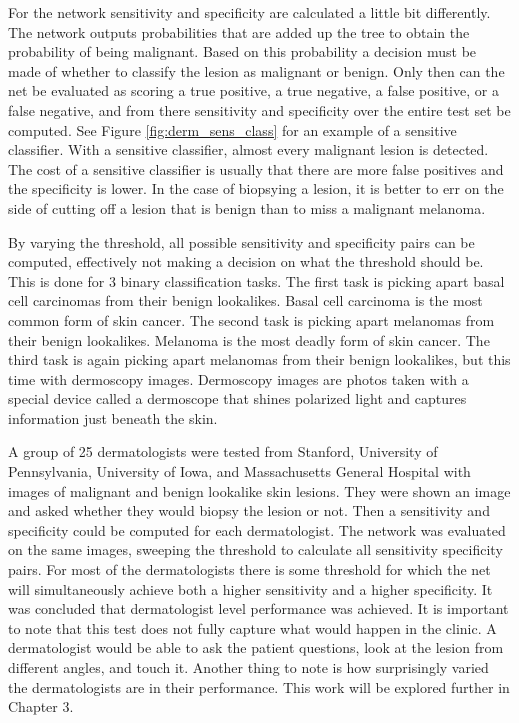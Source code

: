For the network sensitivity and specificity are calculated a little bit differently.  The network outputs probabilities that are added up the tree to obtain the probability of being malignant.  Based on this probability a decision must be made of whether to classify the lesion as malignant or benign.  Only then can the net be evaluated as scoring a true positive, a true negative, a false positive, or a false negative, and from there sensitivity and specificity over the entire test set be computed.  See Figure \ref{fig:derm_sens_class} for an example of a sensitive classifier.  With a sensitive classifier, almost every malignant lesion is detected.  The cost of a sensitive classifier is usually that there are more false positives and the specificity is lower.  In the case of biopsying a lesion, it is better to err on the side of cutting off a lesion that is benign than to miss a malignant melanoma.

By varying the threshold, all possible sensitivity and specificity pairs can be computed, effectively not making a decision on what the threshold should be.  This is done for 3 binary classification tasks.  The first task is picking apart basal cell carcinomas from their benign lookalikes.  Basal cell carcinoma is the most common form of skin cancer.  The second task is picking apart melanomas from their benign lookalikes.  Melanoma is the most deadly form of skin cancer.  The third task is again picking apart melanomas from their benign lookalikes, but this time with dermoscopy images.  Dermoscopy images are photos taken with a special device called a dermoscope that shines polarized light and captures information just beneath the skin.

A group of 25 dermatologists were tested from Stanford, University of Pennsylvania, University of Iowa, and Massachusetts General Hospital with images of malignant and benign lookalike skin lesions.  They were shown an image and asked whether they would biopsy the lesion or not.  Then a sensitivity and specificity could be computed for each dermatologist.  The network was evaluated on the same images, sweeping the threshold to calculate all sensitivity specificity pairs.  For most of the dermatologists there is some threshold for which the net will simultaneously achieve both a higher sensitivity and a higher specificity.  It was concluded that dermatologist level performance was achieved.  It is important to note that this test does not fully capture what would happen in the clinic.  A dermatologist would be able to ask the patient questions, look at the lesion from different angles, and touch it.  Another thing to note is how surprisingly varied the dermatologists are in their performance.  This work will be explored further in Chapter 3.

